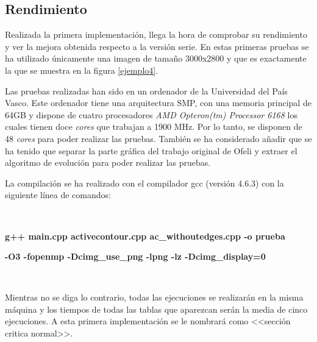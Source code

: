  
\subsection{Rendimiento}
 
Realizada la primera implementaci\'{o}n, llega la hora de comprobar su rendimiento y ver la mejora obtenida respecto a la versi\'{o}n serie. En estas primeras pruebas se ha utilizado \'{u}nicamente una imagen de tama\~{n}o 3000x2800 y que es exactamente la que se muestra en la figura \ref{ejemplo4}.

Las pruebas realizadas han sido en un ordenador de la Universidad del Pa\'{i}s Vasco. Este ordenador tiene una arquitectura SMP, con una memoria principal de 64GB y dispone de cuatro procesadores \textit{AMD Opteron(tm) Processor 6168} los cuales tienen doce \textit{cores} que trabajan a 1900 MHz. Por lo tanto, se disponen de 48 \textit{cores} para poder realizar las pruebas. Tambi\'{e}n se ha considerado a\~{n}adir que se ha tenido que separar la parte gr\'{a}fica del trabajo original de Ofeli y extraer el algoritmo de evoluci\'{o}n para poder realizar las pruebas. 

La compilaci\'{o}n se ha realizado con el compilador gcc (versi\'{o}n 4.6.3) con la siguiente l\'{i}nea de comandos:

\

\quad \quad \textbf{g++ main.cpp activecontour.cpp ac\_withoutedges.cpp -o prueba}

\quad \quad	\textbf{-O3 -fopenmp -Dcimg\_use\_png -lpng -lz -Dcimg\_display=0}

\

Mientras no se diga lo contrario, todas las ejecuciones se realizar\'{a}n en la misma m\'{a}quina y los tiempos de todas las tablas que aparezcan ser\'{a}n la media de cinco ejecuciones. A esta primera implementaci\'{o}n se le nombrar\'{a} como <<secci\'{o}n critica normal>>.


